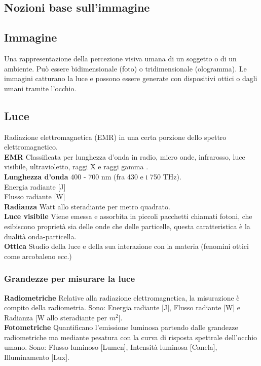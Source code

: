 \documentclass[8pt,a4paper]{article}
\begin{document}
\begin{multicols}{5}
    \section{Nozioni base sull'immagine}
    \subsection{Immagine}
    Una rappresentazione della percezione visiva umana di un soggetto o di un ambiente.
    Può essere bidimensionale (foto) o tridimensionale (ologramma). Le immagini 
    catturano la luce e possono essere generate con dispositivi ottici o dagli umani 
    tramite l’occhio.

    \subsection{Luce}
    Radiazione elettromagnetica (EMR) in una certa porzione dello spettro 
    elettromagnetico. \\
    \textbf{EMR} Classificata per lunghezza d’onda in radio, micro onde, infrarosso, 
    luce visibile, ultravioletto, raggi X e raggi gamma . \\
    \textbf{Lunghezza d'onda} 400 - 700 nm (fra 430 e i 750 THz). \\
    Energia radiante [J]\\
    Flusso radiante [W]\\
    \textbf{Radianza} Watt allo steradiante per metro quadrato. \\
    \textbf{Luce visibile} Viene emessa e assorbita in piccoli pacchetti chiamati 
    fotoni, che esibiscono proprietà sia delle onde che delle particelle, questa 
    caratteristica è la dualità onda-particella. \\
    \textbf{Ottica} Studio della luce e della sua interazione con la materia 
    (fenomini ottici come arcobaleno ecc.) \\ 

    \subsubsection{Grandezze per misurare la luce}
    \textbf{Radiometriche} Relative alla radiazione elettromagnetica, 
    la misurazione è compito della radiometria. Sono: Energia radiante [J],
    Flusso radiante [W] e Radianza [W allo  steradiante per $m^2$]. \\
    \noindent
    \textbf{Fotometriche} Quantificano l’emissione luminosa partendo dalle 
    grandezze radiometriche ma mediante pesatura con la curva di risposta 
    spettrale dell’occhio umano. Sono: Flusso luminoso [Lumen], Intensità 
    luminosa [Canela], Illuminamento [Lux].


\end{multicols}
\end{document}
